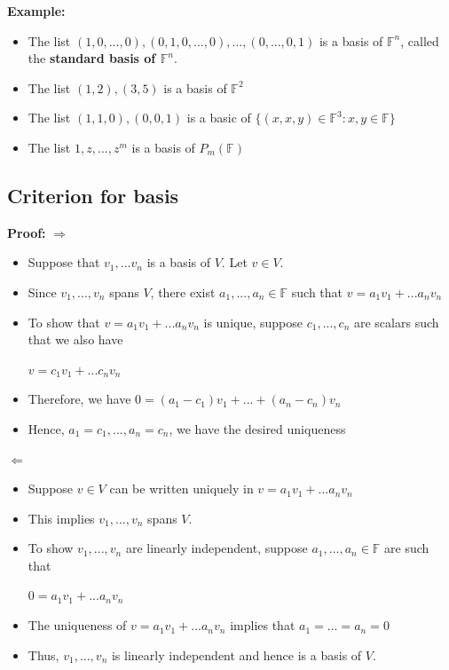 \documentclass{report}
\begin{document}
\textbf{Example:}
\begin{itemize}
    \item The list $(1,0,...,0),(0,1,0,...,0),...,(0,...,0,1)$ is a basis of $\mathbb{F}^n$, called the \textbf{standard basis of $\mathbb{F}^n$}.
    \item The list $(1,2),(3,5)$ is a basis of $\mathbb{F}^2$
    \item The list $(1,1,0),(0,0,1)$ is a basic of $\{(x,x,y) \in \mathbb{F}^3 : x,y \in \mathbb{F} \}$
    \item The list $1,z,...,z^m$ is a basis of $P_m(\mathbb{F})$
\end{itemize}

\subsection{Criterion for basis}

\textbf{Proof:}\newline
$\Rightarrow$
\begin{itemize}
    \item Suppose that $v_1,...v_n$ is a basis of $V$. Let $v \in V$.
    \item Since $v_1,...,v_n$ spans $V$, there exist $a_1,...,a_n \in \mathbb{F}$ such that $v=a_1v_1+...a_nv_n$
    \item To show that $v=a_1v_1+...a_nv_n$ is unique, suppose $c_1,...,c_n$ are scalars such that we also have\newline
              \centerline{$v=c_1v_1+...c_nv_n$}
    \item Therefore, we have $0 = (a_1-c_1)v_1+...+(a_n-c_n)v_n$
    \item Hence, $a_1=c_1,...,a_n=c_n$, we have the desired uniqueness
\end{itemize}

$\Leftarrow$
\begin{itemize}
    \item Suppose $v \in V$ can be written uniquely in $v=a_1v_1+...a_nv_n$
    \item This implies $v_1,...,v_n$ spans $V$.
    \item To show $v_1,...,v_n$ are linearly independent, suppose $a_1,...,a_n \in \mathbb{F}$ are such that\newline
        \centerline{$0=a_1v_1+...a_nv_n$}
    \item The uniqueness of $v=a_1v_1+...a_nv_n$ implies that $a_1=...=a_n=0$
    \item Thus, $v_1,...,v_n$ is linearly independent and hence is a basis of $V$.
\end{itemize}
\end{document}
